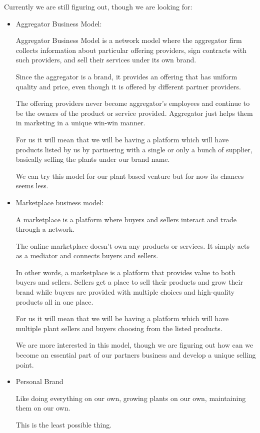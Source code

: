 \documentclass{article}
\begin{document}
\large Currently we are still figuring out, though we are looking for:
\begin{itemize}
    \item Aggregator Business Model: 
    
    Aggregator Business Model is a network model where the aggregator firm collects information about particular offering providers, sign contracts with such providers, and sell their services under its own brand.
    
    Since the aggregator is a brand, it provides an offering that has uniform quality and price, even though it is offered by different partner providers. 
    
    The offering providers never become aggregator’s employees and continue to be the owners of the product or service provided. Aggregator just helps them in marketing in a unique win-win manner. 
   
    
    For us it will mean that we will be having a platform which will have products listed by us by partnering with a single or only a bunch of supplier, basically selling the plants under our brand name.
    
    We can try this model for our plant based venture but for now its chances seems less.
    
    \item Marketplace business model:
    
    A marketplace is a platform where buyers and sellers interact and trade through a network.
    
    The online marketplace doesn’t own any products or services. It simply acts as a mediator and connects buyers and sellers.
    
    In other words, a marketplace is a platform that provides value to both buyers and sellers. Sellers get a place to sell their products and grow their brand while buyers are provided with multiple choices and high-quality products all in one place.
    
    For us it will mean that we will be having a platform which will have multiple plant sellers and buyers choosing from the listed products.
    
    We are more interested in this model, though we are figuring out how can we become an essential part of our partners business and develop a unique selling point.
    
    \item Personal Brand
    
    Like doing everything on our own, growing plants on our own, maintaining them on our own.
    
    This is the least possible thing.

\end{itemize}
\end{document}
